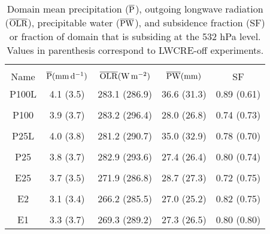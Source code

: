\documentclass[draft]{agujournal2019}
\begin{document}
\begin{table}
\begin{center}
\caption{Domain mean precipitation ($\overline{\rm{P}}$), outgoing longwave radiation 
($\overline{\rm{OLR}}$), precipitable water ($\overline{\rm{PW}}$), and subsidence fraction (SF)  
or fraction of domain that is subsiding at the 532 hPa level.
Values in parenthesis correspond to LWCRE-off experiments.}
    \begin{tabular}{*{5}{c}}
    \hline
    \hline
    \\
 Name &   $\overline{\rm{P}} (\mathrm{mm \,d^{-1}})$ & $\overline{\rm{OLR}} (\rm{W \, m^{-2}})$ & $\overline{\rm{PW}} (\rm{mm})$ & SF   \\ \hline
  P100L   &  4.1 (3.5)   &  283.1 (286.9)  & 36.6 (31.3)  & 0.89 (0.61)      \\ 
    \\
  P100 &   3.9 (3.7)   &  283.2 (296.4)  & 28.0 (26.8) & 0.74 (0.73)           \\  
    \\
  P25L &   4.0 (3.8)  &  281.2 (290.7)   & 35.0 (32.9) & 0.78 (0.70)          \\  
    \\
  P25  &   3.8 (3.7)    & 282.9 (293.6)   & 27.4 (26.4) & 0.80 (0.74)          \\  
    \\
 E25  & 3.7 (3.5)    &   271.9 (286.8)   & 28.7 (27.3) & 0.72 (0.75)            \\  
    \\
 E2   &  3.1 (3.4)   &  266.2 (285.5)    & 27.0 (25.2) & 0.82 (0.75)           \\ 
    \\
 E1   &  3.3 (3.7)   &  269.3 (289.2)    & 27.3 (26.5) & 0.80 (0.80)         \\  \hline

    \end{tabular}\par
    \label{tab:experimentmeans}
\end{center}
\end{table}


\end{document}
